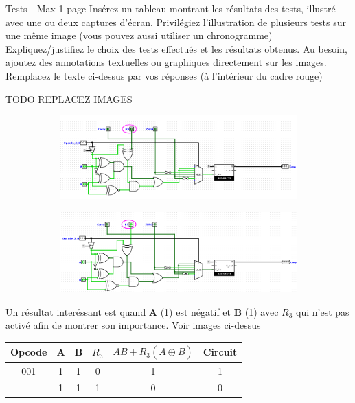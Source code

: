 \documentclass[a4paper]{article}
\begin{document}
\begin{tcolorbox}[colframe=Monokaimagenta,colback=white]
Tests - Max 1 page 
Insérez  un tableau montrant les résultats des tests, illustré avec une ou deux captures d’écran. Privilégiez l’illustration de plusieurs tests sur une même image (vous pouvez aussi utiliser un chronogramme)
Expliquez/justifiez le choix des tests effectués et les résultats obtenus.
Au besoin, ajoutez des annotations textuelles ou graphiques directement sur les images.
Remplacez le texte ci-dessus par vos réponses (à l’intérieur du cadre rouge)\\
\end{tcolorbox}
\begin{tcolorbox}[colframe=Monokaimagenta,colback=white]
TODO REPLACEZ IMAGES

\begin{figure}[H]	
	\centering
	\begin{subfigure}[t]{1in}
		\centering
		\includegraphics[width=1.5\textwidth]{src/COMP_TEST_AgeB.png}
		\label{fig:COMPARATEUR_EXEMPLE}	
	\end{subfigure}
	\quad
	\begin{subfigure}[t]{1in}
		\centering
		\includegraphics[width=1.5\textwidth]{src/COMP_TEST_AgeB1.png}
		\label{fig:COMPARATEUR_EXEMPLE_1}
	\end{subfigure}
\end{figure}    
    
    Un résultat interéssant est quand \textbf{A} (1) est négatif et \textbf{B} (1) avec $R_3$ qui n'est pas activé afin de montrer son importance. Voir images ci-dessus
\begin{tabular}{|c|c|c|c|cc|}
\hline
    Opcode & A & B & $R_3$ & $\overline{A} B + \overline{R_3}(\overline{A \oplus B})$ & Circuit\\
   \hline
    001    & 1 & 1 & 0     & 1             & 1 \\           
           & 1 & 1 & 1     & 0             & 0 \\
    \hline
\end{tabular}


\end{tcolorbox}
\end{document}
